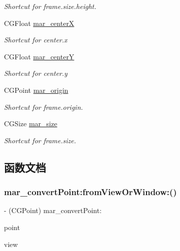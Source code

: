 \begin{DoxyCompactItemize}
\begin{DoxyCompactList}\small\item\em Shortcut for frame.\+size.\+height. \end{DoxyCompactList}\item 
C\+G\+Float \hyperlink{category_u_i_view_07_m_a_r_e_x_08_a24e3a1cf4a1154800b43e27a230c570f}{mar\+\_\+centerX}
\begin{DoxyCompactList}\small\item\em Shortcut for center.\+x \end{DoxyCompactList}\item 
C\+G\+Float \hyperlink{category_u_i_view_07_m_a_r_e_x_08_ada621a5702d3ae95b9830d2cd71541f1}{mar\+\_\+centerY}
\begin{DoxyCompactList}\small\item\em Shortcut for center.\+y \end{DoxyCompactList}\item 
C\+G\+Point \hyperlink{category_u_i_view_07_m_a_r_e_x_08_a5ccc873b9a7bc609f9802205a8728322}{mar\+\_\+origin}
\begin{DoxyCompactList}\small\item\em Shortcut for frame.\+origin. \end{DoxyCompactList}\item 
C\+G\+Size \hyperlink{category_u_i_view_07_m_a_r_e_x_08_aa2b881ae2a856cf681f0db0b591830eb}{mar\+\_\+size}
\begin{DoxyCompactList}\small\item\em Shortcut for frame.\+size. \end{DoxyCompactList}\end{DoxyCompactItemize}


\subsection{函数文档}
\mbox{\label{category_u_i_view_07_m_a_r_e_x_08_aef393cf3d62c21bd1a1d0fdc27e68bff}} 
\subsubsection{\texorpdfstring{mar\+\_\+convert\+Point\+:from\+View\+Or\+Window\+:()}{mar\_convertPoint:fromViewOrWindow:()}\hspace{0.1cm}{\footnotesize\ttfamily [1/2]}}
{\footnotesize\ttfamily -\/ (C\+G\+Point) mar\+\_\+convert\+Point\+: \begin{DoxyParamCaption}\item[{(C\+G\+Point)}]{point }\item[{fromViewOrWindow:(nullable U\+I\+View $\ast$)}]{view }\end{DoxyParamCaption}}

